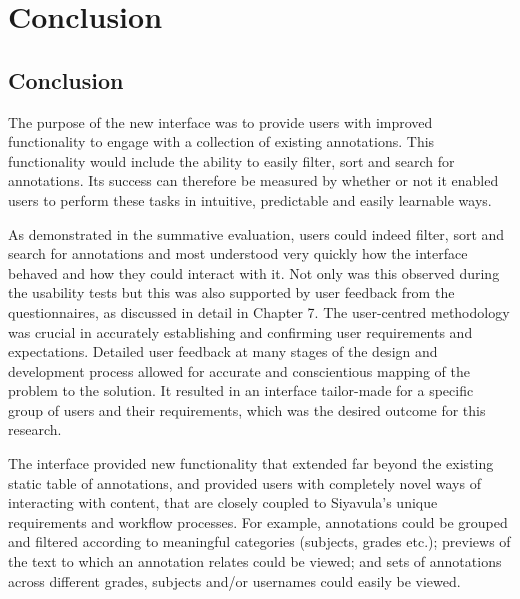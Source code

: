 
\chapter{Conclusion} %

\label{Conclusion} %



\section{Conclusion}
The purpose of the new interface was to provide users with improved functionality to engage with a collection of existing annotations. This functionality would include the ability to easily filter, sort and search for annotations. Its success can therefore be measured by whether or not it enabled users to perform these tasks in intuitive, predictable and easily learnable ways. 

As demonstrated in the summative evaluation, users could indeed filter, sort and search for annotations and most understood very quickly how the interface behaved and how they could interact with it. Not only was this observed during the usability tests but this was also supported by user feedback from the questionnaires, as discussed in detail in Chapter 7. The user-centred methodology was crucial in accurately establishing and confirming user requirements and expectations. Detailed user feedback at many stages of the design and development process allowed for accurate and conscientious mapping of the problem to the solution. It resulted in an interface tailor-made for a specific group of users and their requirements, which was the desired outcome for this research. 

The interface provided new functionality that extended far beyond the existing static table of annotations, and provided users with completely novel ways of interacting with content, that are closely coupled to Siyavula's unique requirements and workflow processes. For example, annotations could be grouped and filtered according to meaningful categories (subjects, grades etc.); previews of the text to which an annotation relates could be viewed; and sets of annotations across different grades, subjects and/or usernames could easily be viewed. 

